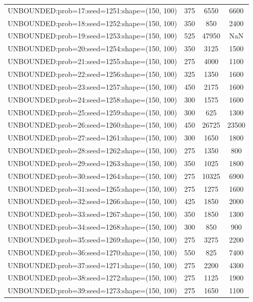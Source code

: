 \begin{longtable}{lccc}
UNBOUNDED:prob=17:seed=1251:shape=(150, 100)  &      375 &  6550 &   6600 \\
UNBOUNDED:prob=18:seed=1252:shape=(150, 100)  &      350 &   850 &   2400 \\
UNBOUNDED:prob=19:seed=1253:shape=(150, 100)  &      525 & 47950 &    NaN \\
UNBOUNDED:prob=20:seed=1254:shape=(150, 100)  &      350 &  3125 &   1500 \\
UNBOUNDED:prob=21:seed=1255:shape=(150, 100)  &      275 &  4000 &   1100 \\
UNBOUNDED:prob=22:seed=1256:shape=(150, 100)  &      325 &  1350 &   1600 \\
UNBOUNDED:prob=23:seed=1257:shape=(150, 100)  &      450 &  2175 &   1600 \\
UNBOUNDED:prob=24:seed=1258:shape=(150, 100)  &      300 &  1575 &   1600 \\
UNBOUNDED:prob=25:seed=1259:shape=(150, 100)  &      300 &   625 &   1300 \\
UNBOUNDED:prob=26:seed=1260:shape=(150, 100)  &      450 & 26725 &  23500 \\
UNBOUNDED:prob=27:seed=1261:shape=(150, 100)  &      300 &  1650 &   1800 \\
UNBOUNDED:prob=28:seed=1262:shape=(150, 100)  &      275 &  1350 &    800 \\
UNBOUNDED:prob=29:seed=1263:shape=(150, 100)  &      350 &  1025 &   1800 \\
UNBOUNDED:prob=30:seed=1264:shape=(150, 100)  &      275 & 10325 &   6900 \\
UNBOUNDED:prob=31:seed=1265:shape=(150, 100)  &      275 &  1275 &   1600 \\
UNBOUNDED:prob=32:seed=1266:shape=(150, 100)  &      425 &  1850 &   2000 \\
UNBOUNDED:prob=33:seed=1267:shape=(150, 100)  &      350 &  1850 &   1300 \\
UNBOUNDED:prob=34:seed=1268:shape=(150, 100)  &      300 &   850 &    900 \\
UNBOUNDED:prob=35:seed=1269:shape=(150, 100)  &      275 &  3275 &   2200 \\
UNBOUNDED:prob=36:seed=1270:shape=(150, 100)  &      550 &   825 &   7400 \\
UNBOUNDED:prob=37:seed=1271:shape=(150, 100)  &      275 &  2200 &   4300 \\
UNBOUNDED:prob=38:seed=1272:shape=(150, 100)  &      275 &  1125 &   1900 \\
UNBOUNDED:prob=39:seed=1273:shape=(150, 100)  &      275 &  1650 &   1100 \\

\end{longtable}
